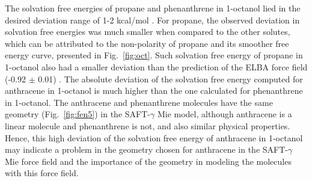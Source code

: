 \documentclass[final,12p,times,twocolumn]{elsarticle}
\begin{document}
    The solvation free energies of propane and phenanthrene in 1-octanol lied in the desired deviation range of 1-2 kcal/mol \cite{doimobley}. For propane, the observed deviation in solvation free energies was much smaller when compared to the other solutes, which can be attributed to the non-polarity of propane and its smoother free energy curve, presented in Fig.~\ref{fig:oct}. Such solvation free energy of propane in 1-octanol also had a smaller deviation than the prediction of the ELBA force field (-0.92 $\pm$ 0.01) \cite{doi:10.1021/acs.jctc.5b00963}. The absolute deviation of the solvation free energy computed for anthracene in 1-octanol is much higher than the one calculated for phenanthrene in 1-octanol. The anthracene and phenanthrene molecules have the same geometry (Fig.~\ref{fig:fen5}) in the SAFT-$\gamma$ Mie model, although anthracene is a linear molecule and phenanthrene is not, and also similar physical properties. Hence, this high deviation of the solvation free energy of anthracene in 1-octanol may indicate a problem in the geometry chosen for anthracene in the SAFT-$\gamma$ Mie force field and the importance of the geometry in modeling the molecules with this force field.   
	
\end{document}

